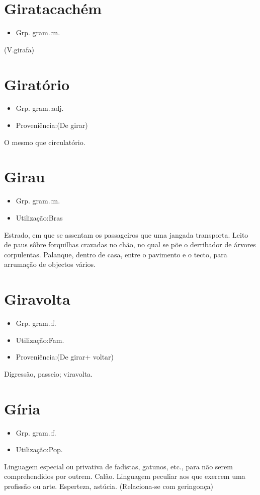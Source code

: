 \section{Giratacachém}
\begin{itemize}
\item {Grp. gram.:m.}
\end{itemize}
(V.girafa)
\section{Giratório}
\begin{itemize}
\item {Grp. gram.:adj.}
\end{itemize}
\begin{itemize}
\item {Proveniência:(De \textunderscore girar\textunderscore )}
\end{itemize}
O mesmo que \textunderscore circulatório\textunderscore .
\section{Girau}
\begin{itemize}
\item {Grp. gram.:m.}
\end{itemize}
\begin{itemize}
\item {Utilização:Bras}
\end{itemize}
Estrado, em que se assentam os passageiros que uma jangada transporta.
Leito de paus sôbre forquilhas cravadas no chão, no qual se põe o derribador de árvores corpulentas.
Palanque, dentro de casa, entre o pavimento e o tecto, para arrumação de objectos vários.
\section{Giravolta}
\begin{itemize}
\item {Grp. gram.:f.}
\end{itemize}
\begin{itemize}
\item {Utilização:Fam.}
\end{itemize}
\begin{itemize}
\item {Proveniência:(De \textunderscore girar\textunderscore  + \textunderscore voltar\textunderscore )}
\end{itemize}
Digressão, passeio; viravolta.
\section{Gíria}
\begin{itemize}
\item {Grp. gram.:f.}
\end{itemize}
\begin{itemize}
\item {Utilização:Pop.}
\end{itemize}
Linguagem especial ou privativa de fadistas, gatunos, etc., para não serem comprehendidos por outrem.
Calão.
Linguagem peculiar aos que exercem uma profissão ou arte.
Esperteza, astúcia.
(Relaciona-se com \textunderscore geringonça\textunderscore )

